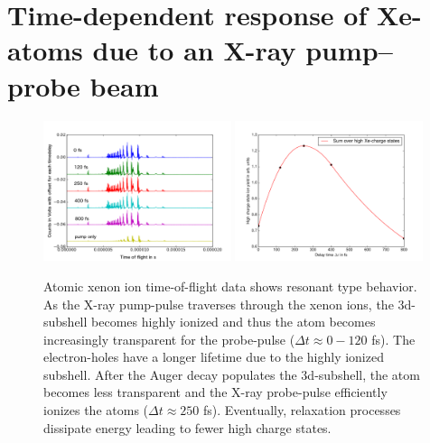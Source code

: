 \section{Time-dependent response of Xe-atoms due to an X-ray pump--probe beam}\label{sec:time-resolved-xe-atoms}
\begin{figure}
	\centering
		\includegraphics[width=0.49\textwidth]{images/results/TOF-atomic-xenon.png}
		\includegraphics[width=0.49\textwidth]{images/results/atomic-charge-state-time-resolved.pdf}
	\caption[Time-resolved answer of atomic xenon in TOF spectroscopy.]{Atomic xenon ion time-of-flight data shows resonant type behavior. As the X-ray pump-pulse traverses through the xenon ions, the 3d-subshell becomes highly ionized and thus the atom becomes increasingly transparent for the probe-pulse ($\Delta t \approx 0-120$ fs). The electron-holes have a longer lifetime due to the highly ionized subshell. After the Auger decay populates the 3d-subshell, the atom becomes less transparent and the X-ray probe-pulse efficiently ionizes the atoms ($\Delta t \approx 250$ fs). Eventually, relaxation processes dissipate energy leading to fewer high charge states.}
	\label{fig:TOF-atomic-xenon}
\end{figure}
